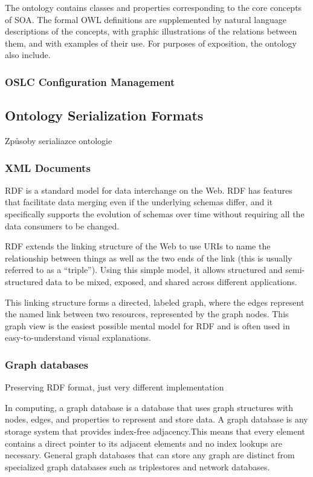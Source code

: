 The ontology contains classes and properties corresponding to the core concepts of SOA. The formal OWL definitions are supplemented by natural language descriptions of the concepts, with graphic illustrations of the relations between them, and with examples of their use. For purposes of exposition, the ontology also include.


\subsubsection{OSLC Configuration Management}


\subsection{Ontology Serialization Formats}

Způsoby serialiazce ontologie

\subsubsection{XML Documents}

RDF is a standard model for data interchange on the Web. RDF has features that facilitate data merging even if the underlying schemas differ, and it specifically supports the evolution of schemas over time without requiring all the data consumers to be changed.

RDF extends the linking structure of the Web to use URIs to name the relationship between things as well as the two ends of the link (this is usually referred to as a “triple”). Using this simple model, it allows structured and semi-structured data to be mixed, exposed, and shared across different applications. 

This linking structure forms a directed, labeled graph, where the edges represent the named link between two resources, represented by the graph nodes. This graph view is the easiest possible mental model for RDF and is often used in easy-to-understand visual explanations. 


\subsubsection{Graph databases}

Preserving RDF format, just very different implementation 

In computing, a graph database is a database that uses graph structures with nodes, edges, and properties to represent and store data. A graph database is any storage system that provides index-free adjacency.This means that every element contains a direct pointer to its adjacent elements and no index lookups are necessary. General graph databases that can store any graph are distinct from specialized graph databases such as triplestores and network databases.

